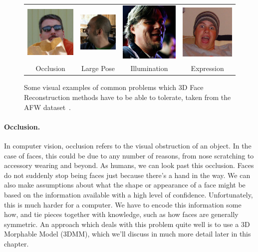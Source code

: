 \begin{figure}
  \begin{tabular}{cccc}
    \includegraphics[width=0.22\linewidth]{img/afw/occlusion.jpg} &
    \includegraphics[width=0.22\linewidth]{img/afw/pose.jpg} &
    \includegraphics[width=0.22\linewidth]{img/afw/illumination.jpg} &
    \includegraphics[width=0.22\linewidth]{img/afw/expression.jpg} \\
    Occlusion & Large Pose & Illumination & Expression
  \end{tabular}
  \caption[Visual examples of challenging images]{Some visual examples
    of common problems which 3D Face Reconstruction methods have to be
    able to tolerate, taken from the AFW dataset~\cite{zhu2012face}.}
  \label{fig:faceproblems}
\end{figure}


\paragraph{Occlusion.} In computer vision, occlusion refers to the
visual obstruction of an object. In the case of faces, this could be
due to any number of reasons, from nose scratching to accessory
wearing and beyond. As humans, we can look past this occlusion. Faces
do not suddenly stop being faces just because there's a hand in the
way. We can also make assumptions about what the shape or appearance
of a face might be based on the information available with a high
level of confidence. Unfortunately, this is much harder for a
computer. We have to encode this information some how, and tie pieces
together with knowledge, such as how faces are generally symmetric. An
approach which deals with this problem quite well is to use a 3D
Morphable Model (3DMM), which we'll discuss in much more detail later
in this chapter.

